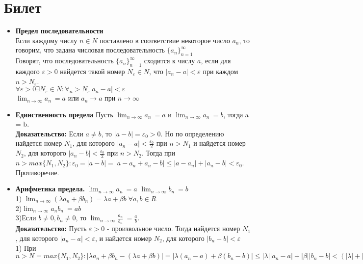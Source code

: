 \documentclass[12pt,a4paper]{article}
\begin{document}
\section{Билет}
\begin{itemize}
    \item \textbf{Предел последовательности} \\
    Если каждому числу $n \in N$ поставлено в соответствие некоторое число $a_n$, то говорим, что задана числовая последовательность $\{a_n\}_{n=1}^{\infty}$ \\
    Говорят, что последовательность $\{a_n\}_{n=1}^{\infty}$ сходится к числу $a$, если для каждого $\varepsilon > 0$ найдется такой номер $N_{\varepsilon} \in N$, что $|a_n - a| < \varepsilon$ при каждом $n > N_{\varepsilon}$. \\
    $\forall \varepsilon > 0  \exists N_{\varepsilon} \in N : \forall_n> N_{\varepsilon} |a_n - a| < \varepsilon$ \\
    $ \lim_{n\to\infty} a_n \ = a$  или $a_n \to a$ при $n \to \infty$
    \item \textbf{Единственность предела}
    Пусть  $\lim_{n \to \infty} a_n\ = a$ и $\lim_{n \to \infty} a_n\ = b$, тогда a = b. \\
    \textbf{Доказательство:} Если $a \neq b$, то $|a - b| = \varepsilon_0 > 0$. Но по определению найдется номер $N_1$, для которого $|a_n - a| < \frac{\varepsilon_0}{2}$ при $n > N_1$ и найдется номер $N_2$, для которого $|a_n - b| < \frac{\varepsilon_0}{2}$ при $n > N_2$. Тогда при $n > max \{N_1, N_2\} : \varepsilon_0 = |a - b| = |a - a_n + a_n - b| \leq |a - a_n| + |a_n - b| < \varepsilon_0$. Противоречие.
    \item \textbf{Арифметика предела.}
    $\lim_{n \to \infty} a_n\ = a$  $\lim_{n \to \infty} b_n\ = b$\\
    1) $ \lim_{n \to \infty} (\lambda a_n + \beta b_n) = \lambda a + \beta b \;  \forall a, b \in R $ \\
    2)$\lim_{n \to \infty} a_n b_n\ = ab$\\
    3)Если $b \neq 0, b_n \neq 0$, то $\lim_{n \to \infty} \frac{a_n}{b_n}\ = \frac{a}{b}$. \\
    \textbf{Доказательство:} Пусть $\varepsilon > 0$ - произвольное число. Тогда найдется номер $N_1$, для которого $|a_n - a| < \varepsilon$, и найдется номер $N_2$, для которого $|b_n - b| < \varepsilon$\\
    1) При $n > N = max\{ N_1, N_2 \} : |\lambda a_n + \beta b_n - (\lambda a + \beta b)| = |\lambda(a_n - a) + \beta(b_n - b)| \leq |\lambda| |a_n - a| + |\beta| |b_n - b| < (|\lambda| + |\beta|)\varepsilon$ \\

\end{itemize}
\end{document}
